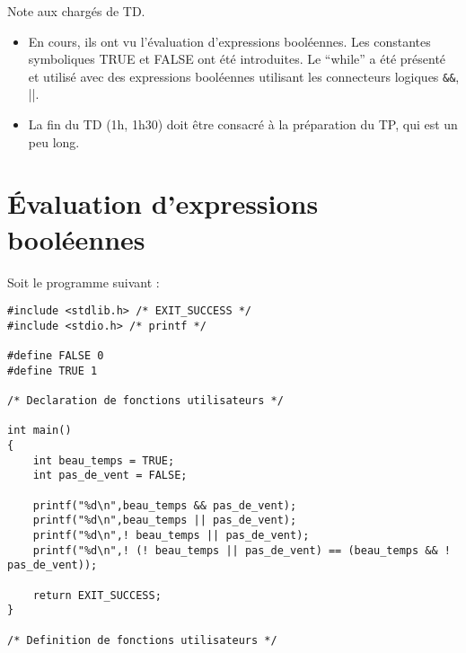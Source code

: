 
\newcommand{\commentaire}[1]{}


\begin{correction}
  Note aux chargés de TD.
  \begin{itemize}
  \item En cours, ils ont vu l'évaluation d'expressions booléennes. Les constantes symboliques TRUE et FALSE ont été introduites. Le ``while'' a été présenté et utilisé avec des expressions booléennes utilisant les connecteurs logiques \verb|&&|, \verb||||.
  \item La fin du TD (1h, 1h30) doit être consacré à la préparation du TP, qui est un peu long.
  \end{itemize}
\end{correction}

\section{Évaluation d'expressions booléennes}
\label{intro}

Soit le programme suivant :
\begin{verbatim}
#include <stdlib.h> /* EXIT_SUCCESS */
#include <stdio.h> /* printf */

#define FALSE 0
#define TRUE 1

/* Declaration de fonctions utilisateurs */

int main()
{
    int beau_temps = TRUE;
    int pas_de_vent = FALSE;

    printf("%d\n",beau_temps && pas_de_vent);
    printf("%d\n",beau_temps || pas_de_vent);
    printf("%d\n",! beau_temps || pas_de_vent);
    printf("%d\n",! (! beau_temps || pas_de_vent) == (beau_temps && ! pas_de_vent));

    return EXIT_SUCCESS;
}

/* Definition de fonctions utilisateurs */
\end{verbatim}

